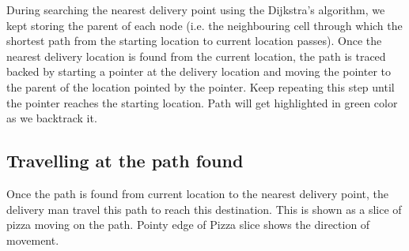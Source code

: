 \documentclass{article}
\begin{document}
During searching the nearest delivery point using the Dijkstra's algorithm, we kept storing the parent of each node (i.e. the neighbouring cell through which the shortest path from the starting location to current location passes). Once the nearest delivery location is found from the current location, the path is traced backed by starting a pointer at the delivery location and moving the pointer to the parent of the location pointed by the pointer. Keep repeating this step until the pointer reaches the starting location. Path will get highlighted in green color as we backtrack it.
\begin{figure}[H]
     \centering
\end{figure}

\subsection{Travelling at the path found}
Once the path is found from current location to the nearest delivery point, the delivery man travel this path to reach this destination. This is shown as a slice of pizza moving on the path. Pointy edge of Pizza slice shows the direction of movement.
\begin{figure}[H]
     \centering
\end{figure}
\end{document}

